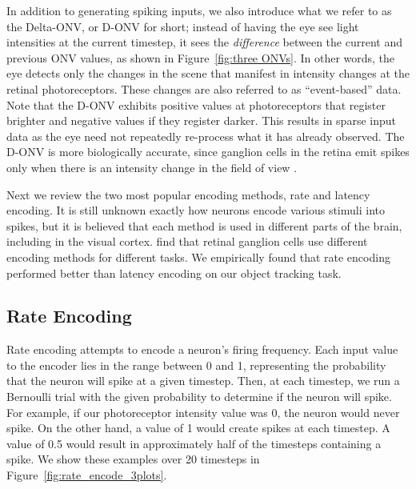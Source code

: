 \documentclass [MS] {UCLAthesis}
\begin{document}
In addition to generating spiking inputs, we also introduce what we refer to as the Delta-ONV, or D-ONV for short; instead of having the eye see light intensities at the current timestep, it sees the \emph{difference} between the current and previous ONV values, as shown in Figure~\ref{fig:three ONVs}. In other words, the eye detects only the changes in the scene that manifest in intensity changes at the retinal photoreceptors. These changes are also referred to as ``event-based'' data. Note that the D-ONV exhibits positive values at photoreceptors that register brighter and negative values if they register darker. This results in sparse input data as the eye need not repeatedly re-process what it has already observed. The D-ONV is more biologically accurate, since ganglion cells in the retina emit spikes only when there is an intensity change in the field of view \citep{eventRetina}.


Next we review the two most popular encoding methods, rate and latency encoding. It is still unknown exactly how neurons encode various stimuli into spikes, but it is believed that each method is used in different parts of the brain, including in the visual cortex. \citet{spike_encoding_real_retina} find that retinal ganglion cells use different encoding methods for different tasks. We empirically found that rate encoding performed better than latency encoding on our object tracking task.


\subsection{Rate Encoding}

Rate encoding attempts to encode a neuron's firing frequency. Each input value to the encoder lies in the range between 0 and 1, representing the probability that the neuron will spike at a given timestep. Then, at each timestep, we run a Bernoulli trial with the given probability to determine if the neuron will spike. For example, if our photoreceptor intensity value was 0, the neuron would never spike. On the other hand, a value of 1 would create spikes at each timestep. A value of 0.5 would result in approximately half of the timesteps containing a spike. We show these examples over 20 timesteps in Figure~\ref{fig:rate_encode_3plots}.
\end{document}
